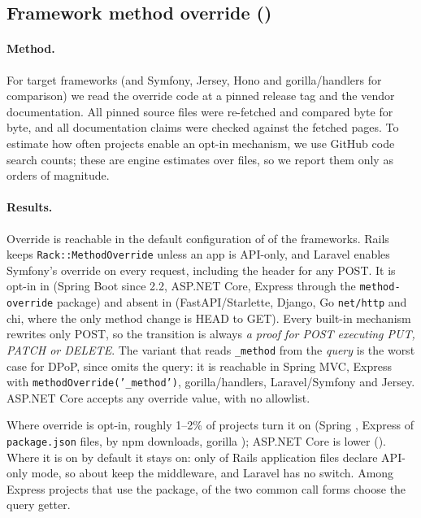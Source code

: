 \subsection{Framework method override ()}\label{sec:prev:e2}

\paragraph{Method.} For \NumTargetFrameworks{} target frameworks (and Symfony,
Jersey, Hono and gorilla/handlers for comparison) we read the override code at a
pinned release tag and the vendor documentation. All \NumPinnedSourcesVerified{}
pinned source files were re-fetched and compared byte for byte, and all
\NumDocChecks{} documentation claims were checked against the fetched pages. To
estimate how often projects enable an opt-in mechanism, we use GitHub code
search counts; these are engine estimates over files, so we report them only as
orders of magnitude.

\paragraph{Results.} Override is reachable in the default configuration of
\NumOverrideFrameworks{} of the \NumTargetFrameworks{} frameworks. Rails keeps
\texttt{Rack::MethodOverride} unless an app is API-only, and Laravel enables
Symfony's override on every request, including the
 header for any POST. It is opt-in in
\NumOptInFrameworks{} (Spring Boot since 2.2, ASP.NET Core, Express through the
\texttt{method-override} package) and absent in \NumNoOverrideFrameworks{}
(FastAPI/Starlette, Django, Go \texttt{net/http} and chi, where the only method
change is HEAD to GET). Every built-in mechanism rewrites only POST, so the
transition is always \emph{a proof for POST executing PUT, PATCH or DELETE}.
The variant that reads \texttt{\_method} from the \emph{query} is the worst
case for DPoP, since \htu omits the query: it is reachable in Spring MVC,
Express with \texttt{methodOverride('\_method')}, gorilla/handlers,
Laravel/Symfony and Jersey. ASP.NET Core accepts any override value, with no
allowlist.

Where override is opt-in, roughly 1--2\% of projects turn it on (Spring
\PctEnableSpring{}, Express \PctEnableExpress{} of \texttt{package.json} files,
\PctEnableExpressNpm{} by npm downloads, gorilla \PctEnableGorilla{}); ASP.NET
Core is lower (\PctEnableAspnet{}). Where it is on by default it stays on: only
\PctRailsApiOnly{} of Rails application files declare API-only mode, so about
\PctRailsOverrideOn{} keep the middleware, and Laravel has no switch. Among
Express projects that use the package, \PctExpressQueryGetter{} of the two
common call forms choose the query getter.

